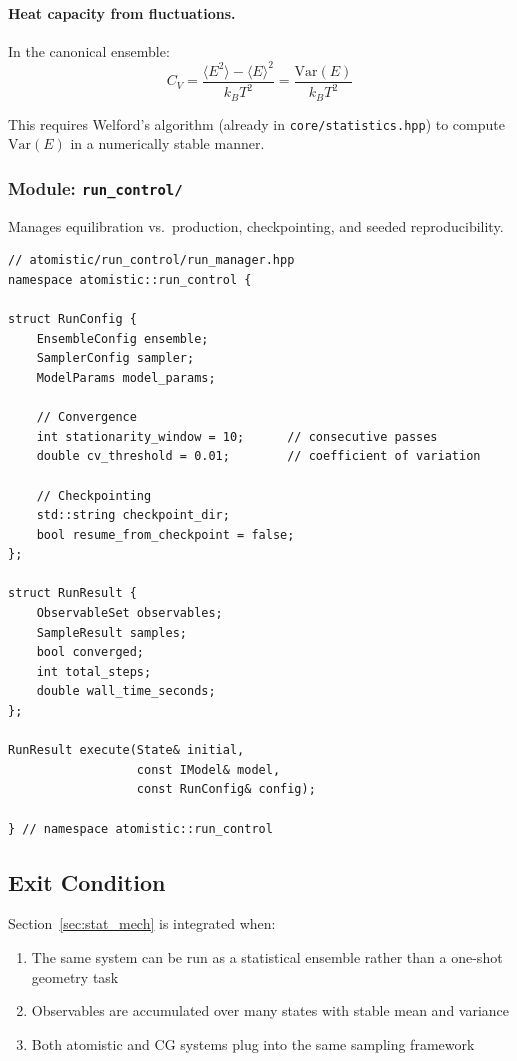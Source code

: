 \documentclass[11pt]{article}
\newcommand{\file}[1]{\texttt{#1}}
\begin{document}
\paragraph{Heat capacity from fluctuations.}
In the canonical ensemble:
\begin{equation}
  C_V = \frac{\langle E^2 \rangle - \langle E \rangle^2}{k_B T^2}
  = \frac{\text{Var}(E)}{k_B T^2}
  \label{eq:Cv_fluctuation}
\end{equation}

This requires Welford's algorithm (already in \file{core/statistics.hpp})
to compute $\text{Var}(E)$ in a numerically stable manner.

\subsubsection{Module: \texttt{run\_control/}}

Manages equilibration vs.\ production, checkpointing, and seeded
reproducibility.

\begin{lstlisting}
// atomistic/run_control/run_manager.hpp
namespace atomistic::run_control {

struct RunConfig {
    EnsembleConfig ensemble;
    SamplerConfig sampler;
    ModelParams model_params;

    // Convergence
    int stationarity_window = 10;      // consecutive passes
    double cv_threshold = 0.01;        // coefficient of variation

    // Checkpointing
    std::string checkpoint_dir;
    bool resume_from_checkpoint = false;
};

struct RunResult {
    ObservableSet observables;
    SampleResult samples;
    bool converged;
    int total_steps;
    double wall_time_seconds;
};

RunResult execute(State& initial,
                  const IModel& model,
                  const RunConfig& config);

} // namespace atomistic::run_control
\end{lstlisting}

\subsection{Exit Condition}

Section~\ref{sec:stat_mech} is integrated when:
\begin{enumerate}
  \item The same system can be run as a statistical ensemble rather than
        a one-shot geometry task
  \item Observables are accumulated over many states with stable mean and
        variance
  \item Both atomistic and CG systems plug into the same sampling framework
\end{enumerate}
\end{document}
